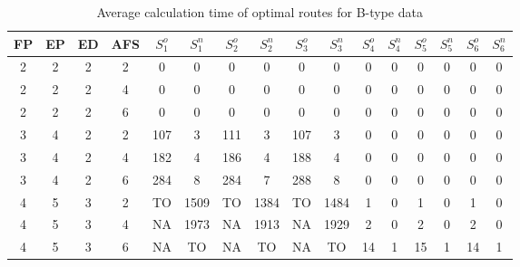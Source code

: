 \begin{longtable}{|c|c|c|c|c c|c c|c c|c c|c c|c c|}
\caption{Average calculation time of optimal routes for B-type data}
\label{tab:avg_time_b} \\
\hline
 FP & EP & ED & AFS & $S^o_1$ & $S^n_1$ & $S^o_2$ & $S^n_2$ & $S^o_3$ & $S^n_3$ & $S^o_4$ & $S^n_4$ & $S^o_5$ & $S^n_5$ & $S^o_6$ & $S^n_6$ \\
\hline\hline
2 & 2 & 2 & 2 & 0 & 0 & 0 & 0 & 0 & 0 & 0 & 0 & 0 & 0 & 0 & 0 \\
\hline
2 & 2 & 2 & 4 & 0 & 0 & 0 & 0 & 0 & 0 & 0 & 0 & 0 & 0 & 0 & 0 \\
\hline
2 & 2 & 2 & 6 & 0 & 0 & 0 & 0 & 0 & 0 & 0 & 0 & 0 & 0 & 0 & 0 \\
\hline
3 & 4 & 2 & 2 & 107 & 3 & 111 & 3 & 107 & 3 & 0 & 0 & 0 & 0 & 0 & 0 \\
\hline
3 & 4 & 2 & 4 & 182 & 4 & 186 & 4 & 188 & 4 & 0 & 0 & 0 & 0 & 0 & 0 \\
\hline
3 & 4 & 2 & 6 & 284 & 8 & 284 & 7 & 288 & 8 & 0 & 0 & 0 & 0 & 0 & 0 \\
\hline
4 & 5 & 3 & 2 & TO & 1509 & TO & 1384 & TO & 1484 & 1 & 0 & 1 & 0 & 1 & 0 \\
\hline
4 & 5 & 3 & 4 & NA & 1973 & NA & 1913 & NA & 1929 & 2 & 0 & 2 & 0 & 2 & 0 \\
\hline
4 & 5 & 3 & 6 & NA & TO & NA & TO & NA & TO & 14 & 1 & 15 & 1 & 14 & 1 \\
\hline
\end{longtable}